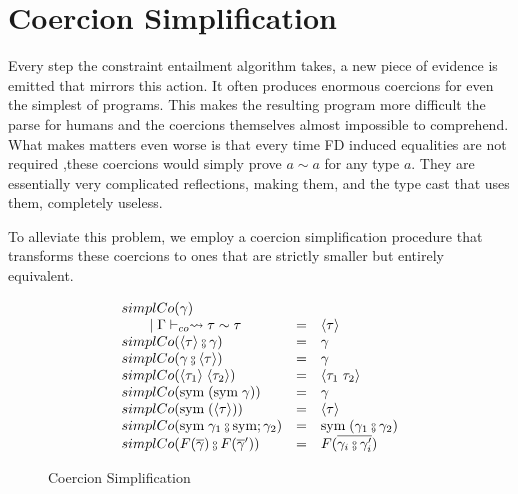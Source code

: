 \chapter{Coercion Simplification}
\label{cha:co-simpl}

Every step the constraint entailment algorithm takes, a new piece of evidence is
emitted that mirrors this action. It often produces enormous coercions for even
the simplest of programs. This makes the resulting program more difficult the
parse for humans and the coercions themselves almost impossible to comprehend.
What makes matters even worse is that every time FD induced equalities are not
required ,these coercions would simply prove $a \sim a$ for any type $a$. They
are essentially very complicated reflections, making them, and the type cast that
uses them, completely useless.

To alleviate this problem, we employ a coercion simplification procedure that
transforms these coercions to ones that are strictly smaller but entirely
equivalent.

\begin{figure}
\[
\begin{array}{l c l}
simplCo(\gamma) \\
\guard \Gamma \vdash_{co} \rightsquigarrow \tau \sim \tau &=& \langle \tau
\rangle
\\
simplCo(\langle \tau \rangle \fctrans \gamma) &=& \gamma
\\
simplCo(\gamma \fctrans \langle \tau \rangle) &=& \gamma
\\
simplCo(\langle \tau_1 \rangle \; \langle \tau_2 \rangle) &=& \langle \tau_1 \;
\tau_2 \rangle
\\
simplCo(\text{sym} \; (\text{sym} \; \gamma)) &=& \gamma
\\
simplCo(\text{sym} \; (\langle \tau \rangle)) &=& \langle \tau \rangle
\\
simplCo(\text{sym} \; \gamma_1 \fctrans \text{sym} ; \gamma_2) &=& \text{sym} \;
(\gamma_1 \fctrans \gamma_2)
\\
simplCo(F(\overline{\gamma}) \fctrans F(\overline{\gamma}')) &=&
F(\overline{\gamma_i \fctrans \gamma_i'})
\end{array}
\]
\caption{Coercion Simplification}
\label{fig:co-simpl}
\end{figure}
